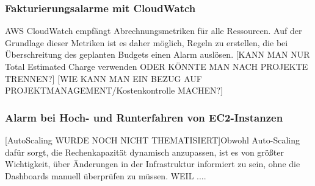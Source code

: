 



\subsubsection{Fakturierungsalarme mit CloudWatch}
AWS CloudWatch empfängt Abrechnungsmetriken für alle Ressourcen. Auf der Grundlage dieser Metriken ist es daher möglich, Regeln zu erstellen, die bei Überschreitung des geplanten Budgets einen Alarm auslösen.
[KANN MAN NUR Total Estimated Charge verwenden ODER KÖNNTE MAN NACH PROJEKTE TRENNEN?]
[WIE KANN MAN EIN BEZUG AUF PROJEKTMANAGEMENT/Kostenkontrolle MACHEN?]

\subsubsection{Alarm bei Hoch- und Runterfahren von EC2-Instanzen}
[AutoScaling WURDE NOCH NICHT THEMATISIERT]Obwohl Auto-Scaling dafür sorgt, die Rechenkapazität dynamisch anzupassen, ist es von größter Wichtigkeit, über Änderungen in der Infrastruktur informiert zu sein, ohne die Dashboards manuell überprüfen zu müssen.
WEIL ....

